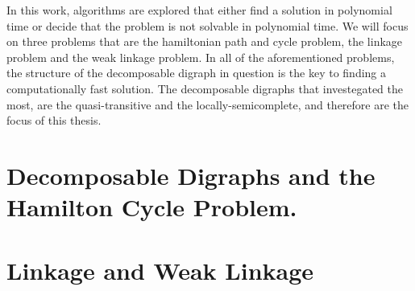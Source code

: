 \documentclass[11pt,oneside,a4paper]{report}
\begin{document}
	In this work, algorithms are explored that either find a solution in polynomial time or decide that the problem is not solvable in polynomial time.
	We will focus on three problems that are the hamiltonian path and cycle problem, the linkage problem and the weak linkage problem.
	In all of the aforementioned problems, the structure of the decomposable digraph in question is the key to finding a computationally fast solution.
	The decomposable digraphs that investegated the most, are the quasi-transitive and the locally-semicomplete, and therefore are the focus of this thesis.

	\part{Decomposable Digraphs and the Hamilton Cycle Problem.}
	
	\clearpage
	\part{Linkage and Weak Linkage}
	
	\clearpage
	\clearpage



\end{document}
